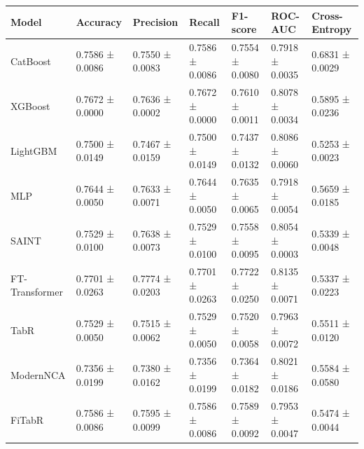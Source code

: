 \begin{tabular}{lllllll}
\toprule
Model & Accuracy & Precision & Recall & F1-score & ROC-AUC & Cross-Entropy \\
\midrule
CatBoost & 0.7586 ± 0.0086 & 0.7550 ± 0.0083 & 0.7586 ± 0.0086 & 0.7554 ± 0.0080 & 0.7918 ± 0.0035 & 0.6831 ± 0.0029 \\
XGBoost & 0.7672 ± 0.0000 & 0.7636 ± 0.0002 & 0.7672 ± 0.0000 & 0.7610 ± 0.0011 & 0.8078 ± 0.0034 & 0.5895 ± 0.0236 \\
LightGBM & 0.7500 ± 0.0149 & 0.7467 ± 0.0159 & 0.7500 ± 0.0149 & 0.7437 ± 0.0132 & 0.8086 ± 0.0060 & 0.5253 ± 0.0023 \\
MLP & 0.7644 ± 0.0050 & 0.7633 ± 0.0071 & 0.7644 ± 0.0050 & 0.7635 ± 0.0065 & 0.7918 ± 0.0054 & 0.5659 ± 0.0185 \\
SAINT & 0.7529 ± 0.0100 & 0.7638 ± 0.0073 & 0.7529 ± 0.0100 & 0.7558 ± 0.0095 & 0.8054 ± 0.0003 & 0.5339 ± 0.0048 \\
FT-Transformer & 0.7701 ± 0.0263 & 0.7774 ± 0.0203 & 0.7701 ± 0.0263 & 0.7722 ± 0.0250 & 0.8135 ± 0.0071 & 0.5337 ± 0.0223 \\
TabR & 0.7529 ± 0.0050 & 0.7515 ± 0.0062 & 0.7529 ± 0.0050 & 0.7520 ± 0.0058 & 0.7963 ± 0.0072 & 0.5511 ± 0.0120 \\
ModernNCA & 0.7356 ± 0.0199 & 0.7380 ± 0.0162 & 0.7356 ± 0.0199 & 0.7364 ± 0.0182 & 0.8021 ± 0.0186 & 0.5584 ± 0.0580 \\
FiTabR & 0.7586 ± 0.0086 & 0.7595 ± 0.0099 & 0.7586 ± 0.0086 & 0.7589 ± 0.0092 & 0.7953 ± 0.0047 & 0.5474 ± 0.0044 \\
\bottomrule
\end{tabular}
